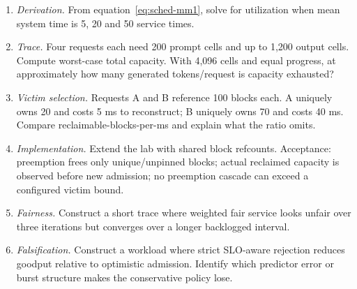 \ExercisesSection
\begin{enumerate}
\item \emph{Derivation.} From equation~\eqref{eq:sched-mm1}, solve for utilization
when mean system time is 5, 20 and 50 service times.
\item \emph{Trace.} Four requests each need 200 prompt cells and up to 1,200 output
cells. Compute worst-case total capacity. With 4,096 cells and equal progress, at
approximately how many generated tokens/request is capacity exhausted?
\item \emph{Victim selection.} Requests A and B reference 100 blocks each. A uniquely
owns 20 and costs 5 ms to reconstruct; B uniquely owns 70 and costs 40 ms. Compare
reclaimable-blocks-per-ms and explain what the ratio omits.
\item \emph{Implementation.} Extend the lab with shared block refcounts. Acceptance:
preemption frees only unique/unpinned blocks; actual reclaimed capacity is observed
before new admission; no preemption cascade can exceed a configured victim bound.
\item \emph{Fairness.} Construct a short trace where weighted fair service looks
unfair over three iterations but converges over a longer backlogged interval.
\item \emph{Falsification.} Construct a workload where strict SLO-aware rejection
reduces goodput relative to optimistic admission. Identify which predictor error or
burst structure makes the conservative policy lose.
\end{enumerate}


